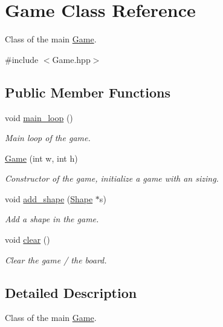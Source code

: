 \hypertarget{classGame}{}\section{Game Class Reference}
\label{classGame}


Class of the main \hyperlink{classGame}{Game}.  




{\ttfamily \#include $<$Game.\+hpp$>$}

\subsection*{Public Member Functions}
\begin{DoxyCompactItemize}
\item 
\mbox{\label{classGame_a9e9a77d478f0c0bfb9b61fb1a6556e15}} 
void \hyperlink{classGame_a9e9a77d478f0c0bfb9b61fb1a6556e15}{main\+\_\+loop} ()
\begin{DoxyCompactList}\small\item\em Main loop of the game. \end{DoxyCompactList}\item 
\hyperlink{classGame_a2b0cb8af7b823a6d595eef9c9641f806}{Game} (int w, int h)
\begin{DoxyCompactList}\small\item\em Constructor of the game, initialize a game with an sizing. \end{DoxyCompactList}\item 
void \hyperlink{classGame_a4c5fae4c7855b0a391c7190889db25d7}{add\+\_\+shape} (\hyperlink{classShape}{Shape} $\ast$s)
\begin{DoxyCompactList}\small\item\em Add a shape in the game. \end{DoxyCompactList}\item 
\mbox{\label{classGame_a8ba8d7bcda356ed584dc445184320ff7}} 
void \hyperlink{classGame_a8ba8d7bcda356ed584dc445184320ff7}{clear} ()
\begin{DoxyCompactList}\small\item\em Clear the game / the board. \end{DoxyCompactList}\end{DoxyCompactItemize}


\subsection{Detailed Description}
Class of the main \hyperlink{classGame}{Game}. 

